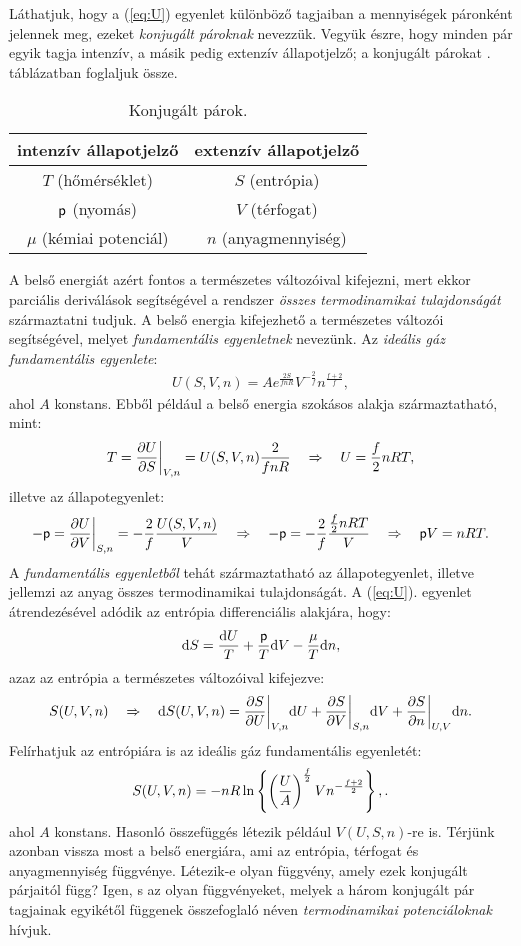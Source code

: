 Láthatjuk, hogy a (\ref{eq:U}) egyenlet különböző tagjaiban a mennyiségek páronként jelennek meg, ezeket \emph{konjugált pároknak} nevezzük. Vegyük észre, hogy minden pár egyik tagja intenzív, a másik pedig extenzív állapotjelző; a konjugált párokat . táblázatban foglaljuk össze.
\begin{table}[h!]
\centering
\begin{tabular}{|c|c|} \hline
intenzív állapotjelző & extenzív állapotjelző\\ \hline\hline
$T$ (hőmérséklet) & $S$ (entrópia)\\ \hline
$\mathsf p$ (nyomás) & $V$ (térfogat)\\ \hline
$\mu$ (kémiai potenciál) & $n$ (anyagmennyiség) \\ \hline
\end{tabular}
\caption{Konjugált párok.}
\label{tab:konj}
\end{table}
A belső energiát azért fontos a természetes változóival kifejezni, mert ekkor parciális deriválások segítségével a rendszer \emph{összes termodinamikai tulajdonságát} származtatni tudjuk. A belső energia kifejezhető a természetes változói segítségével, melyet \emph{fundamentális egyenletnek} nevezünk. Az \emph{ideális gáz fundamentális egyenlete}:
\begin{align}
	U(S,V,n) = A e^{\frac{2S}{fnR}}V^{-\frac 2f}n^{\frac{f+2}{f}},
\end{align}
ahol $A$ konstans. Ebből például a belső energia szokásos alakja származtatható, mint:
\begin{align}
	T = \frac{\partial{U}}{\partial{S}}\bigg|_{V,n} = U(S,V,n) \frac{2}{fnR} \quad\Rightarrow\quad U=\frac f2 nRT,
\end{align}
illetve az állapotegyenlet:
\begin{align}
	-\mathsf p = \frac{\partial{U}}{\partial{V}}\bigg|_{S,n} = -\frac 2f \frac{U(S,V,n)}{V} \quad\Rightarrow\quad -\mathsf p = -\frac 2f \frac{\frac f2 nRT}{V} \quad\Rightarrow\quad \mathsf p V = nRT.
\end{align}
A \emph{fundamentális egyenletből} tehát származtatható az állapotegyenlet, illetve jellemzi az anyag összes termodinamikai tulajdonságát. A (\ref{eq:U}). egyenlet átrendezésével adódik az entrópia differenciális alakjára, hogy:
\begin{align}
	\mathrm{d}S = \frac{\mathrm{d}U}{T} + \frac {\mathsf p} T \mathrm{d}V - \frac \mu T \mathrm{d}n,
\end{align}
azaz az entrópia a természetes változóival kifejezve:
\begin{align}
	S(U,V,n) \quad\Rightarrow\quad \mathrm{d}S(U,V,n) = \frac{\partial{S}}{\partial{U}}\bigg|_{V,n}\mathrm{d}U + \frac{\partial{S}}{\partial{V}} \bigg|_{S,n}\mathrm{d}V + \frac{\partial{S}}{\partial{n}}\bigg|_{U,V} \mathrm{d}n.
\end{align}
Felírhatjuk az entrópiára is az ideális gáz fundamentális egyenletét:
\begin{align}
	S(U,V,n) = -nR\ln\left\{{\left({\frac UA}\right)^{\frac f2}Vn^{{-\frac{f+2}{2}}}}\right\},.
\end{align}
ahol $A$ konstans. Hasonló összefüggés létezik például $V(U,S,n)$-re is. Térjünk azonban vissza most a belső energiára, ami az entrópia, térfogat és anyagmennyiség függvénye. Létezik-e olyan függvény, amely ezek konjugált párjaitól függ? Igen, s az olyan függvényeket, melyek a három konjugált pár tagjainak egyikétől függenek összefoglaló néven \emph{termodinamikai potenciáloknak} hívjuk.

